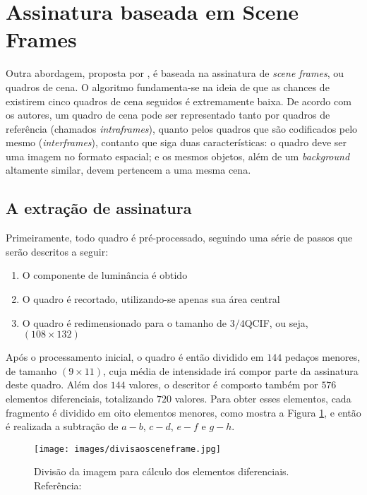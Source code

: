 \section{Assinatura baseada em Scene Frames}


Outra abordagem, proposta por \cite{mao2015sceneframe}, é baseada na assinatura de \textit{scene frames}, ou quadros de cena. O algoritmo fundamenta-se na ideia de que as chances de existirem cinco quadros de cena seguidos é extremamente baixa. De acordo com os autores, um quadro de cena pode ser representado tanto por quadros de referência (chamados \textit{intraframes}), quanto pelos quadros que são codificados pelo mesmo (\textit{interframes}), contanto que siga duas características: o quadro deve ser uma imagem no formato espacial; e os mesmos objetos, além de um \textit{background} altamente similar, devem pertencem a uma mesma cena.

\subsection{A extração de assinatura}

Primeiramente, todo quadro é pré-processado, seguindo uma série de passos que serão descritos a seguir:

\begin{enumerate}
	\item O componente de luminância é obtido
   	\item O quadro é recortado, utilizando-se apenas sua área central
    \item O quadro é redimensionado para o tamanho de $3/4$QCIF, ou seja, $(108\times132)$
\end{enumerate}

Após o processamento inicial, o quadro é então dividido em $144$ pedaços menores, de tamanho $(9\times11)$, cuja média de intensidade irá compor parte da assinatura deste quadro. Além dos $144$ valores, o descritor é composto também por $576$ elementos diferenciais, totalizando $720$ valores. Para obter esses elementos, cada fragmento é dividido em oito elementos menores, como mostra a Figura \ref{fig:divsceneframe}, e então é realizada a subtração de $a - b$, $c - d$, $e - f$ e $g - h$.

\begin{figure}[h]
	\centering
    \label{fig:divsceneframe}
	\texttt{[image: images/divisaosceneframe.jpg]}
    \caption{Divisão da imagem para cálculo dos elementos diferenciais. Referência: \cite{mao2015sceneframe}}
\end{figure}

